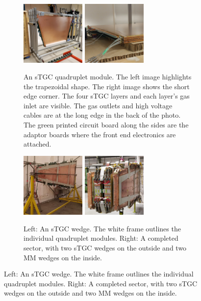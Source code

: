 \begin{figure}
\centering
\begin{subfigure}{\textwidth}
  \centering
  \includegraphics[width=0.35\textwidth]{figures/stgc_quad_cart.jpg}
  \includegraphics[width=0.35\textwidth]{figures/stgc_quad_inlet_corner.jpg}
  \caption{An sTGC quadruplet module. The left image highlights the trapezoidal shape. The right image shows the short edge corner. The four sTGC layers and each layer's gas inlet are visible. The gas outlets and high voltage cables are at the long edge in the back of the photo. The green printed circuit board along the sides are the adaptor boards where the front end electronics are attached.}
  \label{fig:stgc_quad}
\end{subfigure}

\smallskip

\begin{subfigure}{\textwidth}
  \centering
  \includegraphics[width=0.35\textwidth]{figures/stgc_wedge.jpg}
  \includegraphics[width=0.35\textwidth]{figures/sector.jpg}
  \caption{Left: An sTGC wedge. The white frame outlines the individual quadruplet modules. Right: A completed sector, with two sTGC wedges on the outside and two MM wedges on the inside.}
  \label{fig:wedge_and_sector}
\end{subfigure}


\end{figure}
